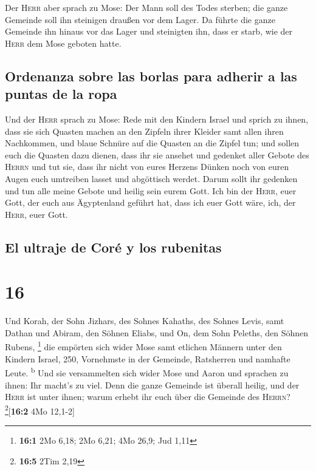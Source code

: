  Der \textsc{Herr} aber sprach zu Mose: Der Mann soll des
Todes sterben; die ganze Gemeinde soll ihn steinigen draußen vor dem
Lager.  Da führte die ganze Gemeinde ihn hinaus vor das
Lager und steinigten ihn, dass er starb, wie der \textsc{Herr} dem Mose
geboten hatte.

\hypertarget{ordenanza-sobre-las-borlas-para-adherir-a-las-puntas-de-la-ropa}{%
\subsection{Ordenanza sobre las borlas para adherir a las puntas de la
ropa}\label{ordenanza-sobre-las-borlas-para-adherir-a-las-puntas-de-la-ropa}}

 Und der \textsc{Herr} sprach zu Mose: 
Rede mit den Kindern Israel und sprich zu ihnen, dass sie sich Quasten
machen an den Zipfeln ihrer Kleider samt allen ihren Nachkommen, und
blaue Schnüre auf die Quasten an die Zipfel tun;  und
sollen euch die Quasten dazu dienen, dass ihr sie ansehet und gedenket
aller Gebote des \textsc{Herrn} und tut sie, dass ihr nicht von eures
Herzens Dünken noch von euren Augen euch umtreiben lasset und abgöttisch
werdet.  Darum sollt ihr gedenken und tun alle meine
Gebote und heilig sein eurem Gott.  Ich bin der
\textsc{Herr}, euer Gott, der euch aus Ägyptenland geführt hat, dass ich
euer Gott wäre, ich, der \textsc{Herr}, euer Gott.

\hypertarget{el-ultraje-de-coruxe9-y-los-rubenitas}{%
\subsection{El ultraje de Coré y los
rubenitas}\label{el-ultraje-de-coruxe9-y-los-rubenitas}}

\hypertarget{section-15}{%
\section{16}\label{section-15}}

 Und Korah, der Sohn Jizhars, des Sohnes Kahaths, des
Sohnes Levis, samt Dathan und Abiram, den Söhnen Eliabs, und On, dem
Sohn Peleths, den Söhnen Rubens, \footnote{\textbf{16:1} 2Mo 6,18; 2Mo
  6,21; 4Mo 26,9; Jud 1,11}  die empörten sich wider Mose
samt etlichen Männern unter den Kindern Israel, 250, Vornehmste in der
Gemeinde, Ratsherren und namhafte Leute. \textsuperscript{b}
 Und sie versammelten sich wider Mose und Aaron und
sprachen zu ihnen: Ihr macht's zu viel. Denn die ganze Gemeinde ist
überall heilig, und der \textsc{Herr} ist unter ihnen; warum erhebt ihr
euch über die Gemeinde des \textsc{Herrn}? \footnote{\textbf{16:5} 2Tim
  2,19}{[}\textbf{16:2} 4Mo 12,1-2{]}


